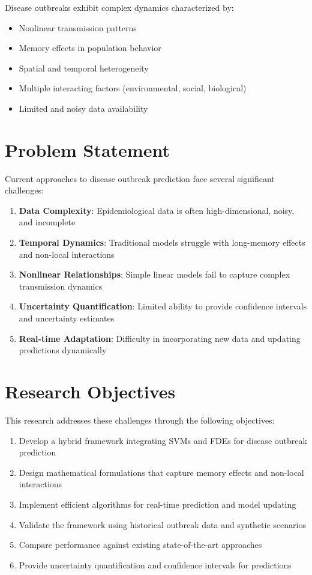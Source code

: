 \documentclass[12pt,a4paper]{report}
\begin{document}
Disease outbreaks exhibit complex dynamics characterized by:
\begin{itemize}
    \item Nonlinear transmission patterns
    \item Memory effects in population behavior
    \item Spatial and temporal heterogeneity
    \item Multiple interacting factors (environmental, social, biological)
    \item Limited and noisy data availability
\end{itemize}

\section{Problem Statement}

Current approaches to disease outbreak prediction face several significant challenges:

\begin{enumerate}
    \item \textbf{Data Complexity}: Epidemiological data is often high-dimensional, noisy, and incomplete
    \item \textbf{Temporal Dynamics}: Traditional models struggle with long-memory effects and non-local interactions
    \item \textbf{Nonlinear Relationships}: Simple linear models fail to capture complex transmission dynamics
    \item \textbf{Uncertainty Quantification}: Limited ability to provide confidence intervals and uncertainty estimates
    \item \textbf{Real-time Adaptation}: Difficulty in incorporating new data and updating predictions dynamically
\end{enumerate}

\section{Research Objectives}

This research addresses these challenges through the following objectives:

\begin{enumerate}
    \item Develop a hybrid framework integrating SVMs and FDEs for disease outbreak prediction
    \item Design mathematical formulations that capture memory effects and non-local interactions
    \item Implement efficient algorithms for real-time prediction and model updating
    \item Validate the framework using historical outbreak data and synthetic scenarios
    \item Compare performance against existing state-of-the-art approaches
    \item Provide uncertainty quantification and confidence intervals for predictions
\end{enumerate}
\end{document}
